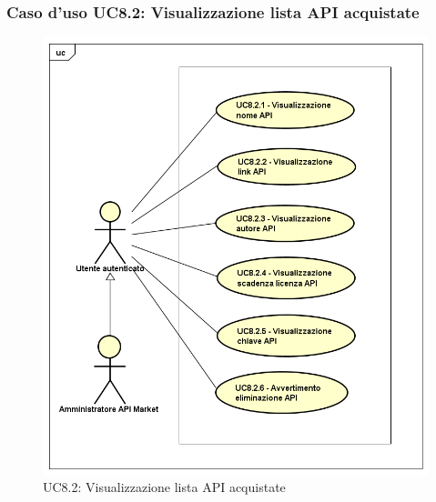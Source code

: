 \subsubsection{Caso d'uso UC8.2: Visualizzazione lista API acquistate}
\label{UC8_2}
\begin{figure}[ht]
	\centering
	\includegraphics[scale=0.45]{UML/UC8_2.png}
	\caption{UC8.2: Visualizzazione lista API acquistate}
\end{figure}

